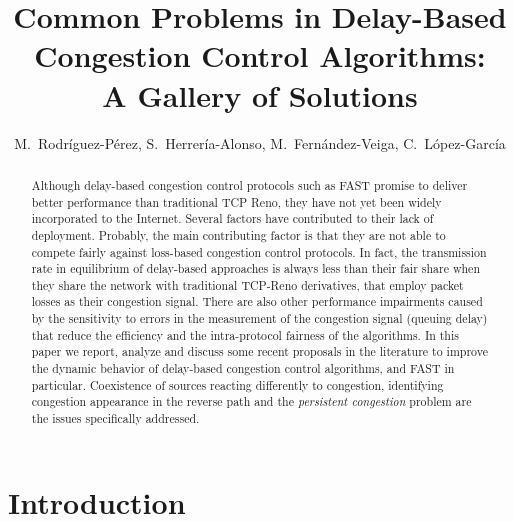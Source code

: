 \documentclass[english,times]{ettauth}
\begin{document}

\title{Common Problems in Delay-Based Congestion Control Algorithms:\\A
  Gallery of Solutions}

\author{M.~Rodríguez-Pérez\corrauth, S.~Herrería-Alonso, 
  M.~Fernández-Veiga, C.~López-García}

\address{Dept.~Telematics Engineering, E.I.~Telecomunicación,
  Campus~Universitario~Lagoas-Marcosende~s/n, 36310~Vigo,~Spain}


\begin{abstract}
  Although delay-based congestion control protocols such as FAST promise to
  deliver better performance than traditional TCP Reno, they have not yet been
  widely incorporated to the Internet. Several factors have contributed to
  their lack of deployment. Probably, the main contributing factor is that
  they are not able to compete fairly against loss-based congestion control
  protocols. In fact, the transmission rate in equilibrium of delay-based
  approaches is always less than their fair share when they share the network
  with traditional TCP-Reno derivatives, that employ packet losses as their
  congestion signal. There are also other performance impairments caused by
  the sensitivity to errors in the measurement of the congestion signal
  (queuing delay) that reduce the efficiency and the intra-protocol fairness
  of the algorithms. In this paper we report, analyze and discuss some recent
  proposals in the literature to improve the dynamic behavior of delay-based
  congestion control algorithms, and FAST in particular. Coexistence of
  sources reacting differently to congestion, identifying congestion
  appearance in the reverse path and the \emph{persistent congestion} problem
  are the issues specifically addressed.
\end{abstract}

\maketitle

\section{Introduction}
\label{sec:introduction}
\end{document}
